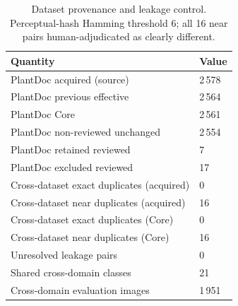 \begin{table}[htbp]
\caption{Dataset provenance and leakage control. Perceptual-hash Hamming threshold 6; all 16 near pairs human-adjudicated as clearly different.}
\label{tab:dataset-provenance}
\centering
\begin{tabular}{ll}
\toprule
Quantity & Value \\
\midrule
PlantDoc acquired (source) & 2\,578 \\
PlantDoc previous effective & 2\,564 \\
PlantDoc Core & 2\,561 \\
PlantDoc non-reviewed unchanged & 2\,554 \\
PlantDoc retained reviewed & 7 \\
PlantDoc excluded reviewed & 17 \\
Cross-dataset exact duplicates (acquired) & 0 \\
Cross-dataset near duplicates (acquired) & 16 \\
Cross-dataset exact duplicates (Core) & 0 \\
Cross-dataset near duplicates (Core) & 16 \\
Unresolved leakage pairs & 0 \\
Shared cross-domain classes & 21 \\
Cross-domain evaluation images & 1\,951 \\
\bottomrule
\end{tabular}
\end{table}
